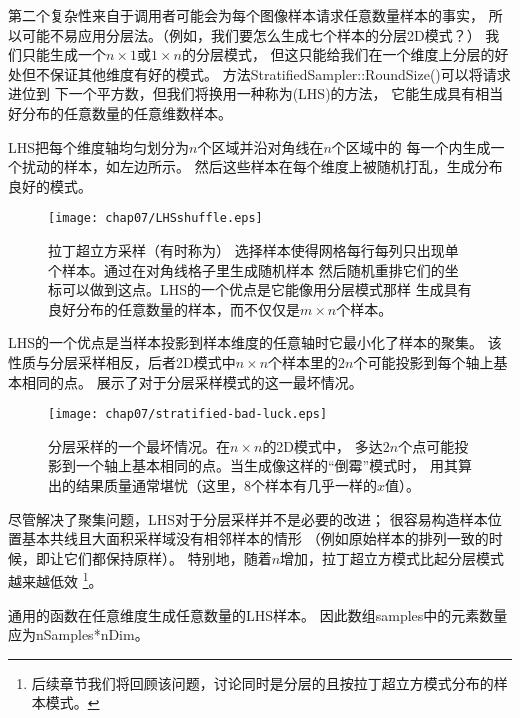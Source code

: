 第二个复杂性来自于调用者可能会为每个图像样本请求任意数量样本的事实，
所以可能不易应用分层法。（例如，我们要怎么生成七个样本的分层2D模式？）
我们只能生成一个$n\times1$或$1\times n$的分层模式，
但这只能给我们在一个维度上分层的好处但不保证其他维度有好的模式。
方法{\ttfamily StratifiedSampler::RoundSize()}可以将请求进位到
下一个平方数，但我们将换用一种称为(LHS)的方法，
它能生成具有相当好分布的任意数量的任意维数样本。

LHS把每个维度轴均匀划分为$n$个区域并沿对角线在$n$个区域中的
每一个内生成一个扰动的样本，如左边所示。
然后这些样本在每个维度上被随机打乱，生成分布良好的模式。
\begin{figure}[htbp]
    \centering\texttt{[image: chap07/LHSshuffle.eps]}
    \caption{拉丁超立方采样（有时称为\protect{}）
        选择样本使得网格每行每列只出现单个样本。通过在对角线格子里生成随机样本
        然后随机重排它们的坐标可以做到这点。LHS的一个优点是它能像用分层模式那样
        生成具有良好分布的任意数量的样本，而不仅仅是$m\times n$个样本。}
    \label{fig:7.20}
\end{figure}

LHS的一个优点是当样本投影到样本维度的任意轴时它最小化了样本的聚集。
该性质与分层采样相反，后者2D模式中$n\times n$个样本里的$2n$个可能投影到每个轴上基本相同的点。
展示了对于分层采样模式的这一最坏情况。
\begin{figure}[htbp]
    \centering\texttt{[image: chap07/stratified-bad-luck.eps]}
    \caption{分层采样的一个最坏情况。在$n\times n$的2D模式中，
        多达$2n$个点可能投影到一个轴上基本相同的点。当生成像这样的“倒霉”模式时，
        用其算出的结果质量通常堪忧（这里，8个样本有几乎一样的$x$值）。}
    \label{fig:7.21}
\end{figure}

尽管解决了聚集问题，LHS对于分层采样并不是必要的改进；
很容易构造样本位置基本共线且大面积采样域没有相邻样本的情形
（例如原始样本的排列一致的时候，即让它们都保持原样）。
特别地，随着$n$增加，拉丁超立方模式比起分层模式越来越低效
\footnote{后续章节我们将回顾该问题，讨论同时是分层的且按拉丁超立方模式分布的样本模式。}。

通用的函数在任意维度生成任意数量的LHS样本。
因此数组{\ttfamily samples}中的元素数量应为{\ttfamily nSamples*nDim}。

